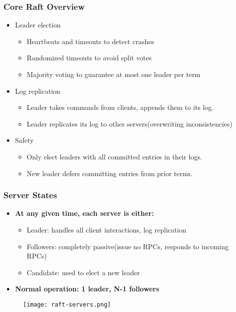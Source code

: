 \begin{frame}
    \frametitle{Core Raft Overview}
    \begin{itemize}
        \item Leader election
            \begin{itemize}
                \item Heartbeats and timeouts to detect crashes
                \item Randomized timeouts to avoid split votes
                \item Majority voting to guarantee at most one leader per term
            \end{itemize}
        \item Log replication
            \begin{itemize}
                \item Leader takes commands from clients, appends them to its log.
                \item Leader replicates its log to other servers(overwriting inconsistencies)
            \end{itemize}
        \item Safety
            \begin{itemize}
                \item Only elect leaders with all committed entries in their logs.
                \item New leader defers committing entries from prior terms.
            \end{itemize}
    \end{itemize}
\end{frame}

\begin{frame}
    \frametitle{Server States}
    \begin{itemize}
        \item \textbf{At any given time, each server is either:}
            \begin{itemize}
                \item \alert{Leader}: handles all client interactions, log replication
                \item \alert{Followers}: completely passive(issue no RPCs, responds to incoming RPCs)
                \item \alert{Candidate}: used to elect a new leader
            \end{itemize}
        \item \textbf{Normal operation: 1 leader, N-1 followers}
    \end{itemize}
    \begin{figure}
        \centering
        \texttt{[image: raft-servers.png]}
    \end{figure}
\end{frame}


